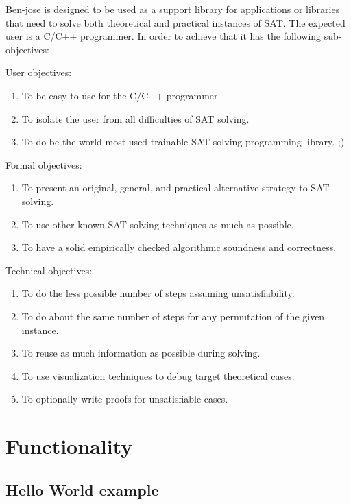 \documentclass{easychair}
\begin{document}
Ben-jose is designed to be used as a support library for applications or libraries that need to solve both theoretical and practical instances of SAT. The expected user is a C/C++ programmer. In order to achieve that it has the following sub-objectives:

User objectives:
\begin{enumerate}
\item
To be easy to use for the C/C++ programmer.
\item
To isolate the user from all difficulties of SAT solving.
\item
To do be the world most used trainable SAT solving programming library. ;)
\end{enumerate}

Formal objectives:
\begin{enumerate}
\item
To present an original, general, and practical alternative strategy to SAT solving.
\item
To use other known SAT solving techniques as much as possible.
\item
To have a solid empirically checked algorithmic soundness and correctness.
\end{enumerate}

Technical objectives:
\begin{enumerate}
\item
To do the less possible number of steps assuming unsatisfiability.
\item
To do about the same number of steps for any permutation of the given instance.
\item
To reuse as much information as possible during solving.
\item
To use visualization techniques to debug target theoretical cases.
\item
To optionally write proofs for unsatisfiable cases.
\end{enumerate}

\section{Functionality}
\label{sect:funtionality}

\subsection{Hello World example}
\label{sect:dimacs}
\end{document}
